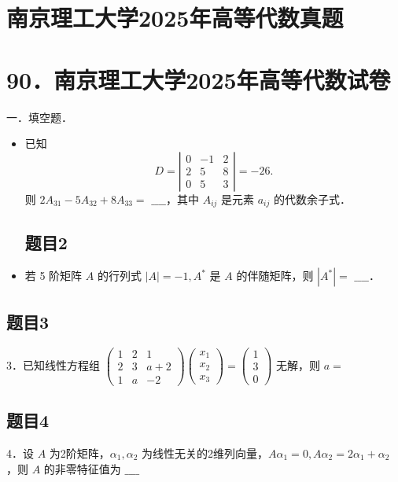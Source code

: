 \documentclass{article}
\begin{document}
\section*{南京理工大学2025年高等代数真题}
\section*{90．南京理工大学2025年高等代数试卷}
一．填空题．

\begin{itemize}

\subsection{题目1}
  \item[1．] 已知
\[
D=\left|\begin{array}{ccc}
0 & -1 & 2 \\
2 & 5 & 8 \\
0 & 5 & 3
\end{array}\right|=-26 .
\]
则 \(2 A_{31}-5 A_{32}+8 A_{33}=\) \(\_\_\_\_\)，其中 \(A_{i j}\) 是元素 \(a_{i j}\) 的代数余子式．

\subsection{题目2}
  \item[2．] 若 5 阶矩阵 \(A\) 的行列式 \(|A|=-1, A^{*}\) 是 \(A\) 的伴随矩阵，则 \(\left|A^{*}\right|=\) \(\_\_\_\_\)．
\end{itemize}

\subsection{题目3}
3．已知线性方程组 \(\left(\begin{array}{ccc}1 & 2 & 1 \\ 2 & 3 & a+2 \\ 1 & a & -2\end{array}\right)\left(\begin{array}{l}x_{1} \\ x_{2} \\ x_{3}\end{array}\right)=\left(\begin{array}{l}1 \\ 3 \\ 0\end{array}\right)\) 无解，则 \(a=\)

\subsection{题目4}
4．设 \(A\) 为2阶矩阵，\(\alpha_{1}, \alpha_{2}\) 为线性无关的2维列向量，\(A \alpha_{1}=0, A \alpha_{2}=2 \alpha_{1}+\alpha_{2}\) ，则 \(A\) 的非零特征值为 \(\_\_\_\_\)
\end{document}
